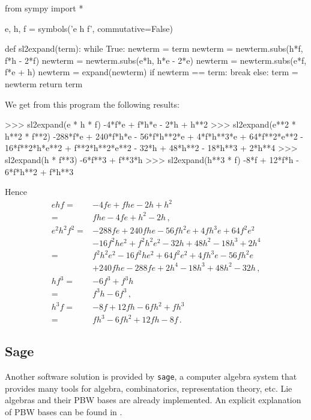 \begin{pythoncode}
from sympy import *

e, h, f = symbols('e h f', commutative=False)

def sl2expand(term):
  while True:
    newterm = term
    newterm = newterm.subs(h*f, f*h - 2*f)
    newterm = newterm.subs(e*h, h*e - 2*e)
    newterm = newterm.subs(e*f, f*e + h)
    newterm = expand(newterm)
    if newterm == term:
      break
    else:
      term = newterm
  return term
\end{pythoncode}
We get from this program the following results:
\begin{consoleoutput}
>>> sl2expand(e * h * f)
-4*f*e + f*h*e - 2*h + h**2
>>> sl2expand(e**2 * h**2 * f**2)
-288*f*e + 240*f*h*e - 56*f*h**2*e + 4*f*h**3*e + 64*f**2*e**2 - 16*f**2*h*e**2 + f**2*h**2*e**2 - 32*h + 48*h**2 - 18*h**3 + 2*h**4
>>> sl2expand(h * f**3)
-6*f**3 + f**3*h
>>> sl2expand(h**3 * f)
-8*f + 12*f*h - 6*f*h**2 + f*h**3
\end{consoleoutput}
Hence
\begin{align*}
  ehf
  ={}&
  - 4 f e + f h e - 2 h + h^2
  \\
  ={}&
  f h e - 4 f e + h^2 - 2 h \,,
  \\
  e^2 h^2 f^2
  ={}&
  -288 f e + 240 f h e - 56 f h^2 e + 4 f h^3 e + 64 f^2 e^2
  \\
  {}&
  - 16 f^2 h e^2 + f^2 h^2 e^2 - 32 h + 48 h^2 - 18 h^3 + 2 h^4
  \\
  ={}&
  f^2 h^2 e^2 - 16 f^2 h e^2 + 64 f^2 e^2 + 4 f h^3 e - 56 f h^2 e
  \\
  {}&
  + 240 f h e - 288 f e + 2 h^4 - 18 h^3 + 48 h^2 - 32 h \,,
  \\
  h f^3
  ={}&
  -6 f^3 + f^3 h
  \\
  ={}&
  f^3 h - 6 f^3 \,,
  \\
  h^3 f
  ={}&
  -8 f + 12 f h - 6 f h^2 + f  h^3
  \\
  ={}&
  f h^3 - 6 f h^2 + 12 f h - 8 f \,.
\end{align*}





\subsection*{Sage}

Another software solution is provided by \texttt{sage}, a computer algebra system that provides many tools for algebra, combinatorics, representation theory, etc.
Lie algebras and their PBW bases are already implemented.
An explicit explanation of PBW bases can be found in \cite{sage_pbw}.

